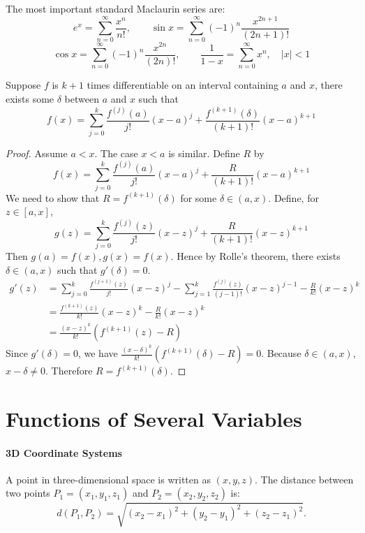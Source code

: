 \documentclass[oneside]{book}
\begin{document}
\noindent The most important standard Maclaurin series are:
\[
    e^x=\sum_{n=0}^{\infty}\frac{x^n}{n!},\qquad
    \sin x=\sum_{n=0}^{\infty}(-1)^n\frac{x^{2n+1}}{(2n+1)!}
\]
\[
    \cos x=\sum_{n=0}^{\infty}(-1)^n\frac{x^{2n}}{(2n)!},\qquad
    \frac1{1-x}=\sum_{n=0}^{\infty}x^n,\quad |x|<1
\]

\begin{theorem}
Suppose \(f\) is \(k+1\) times differentiable on an interval containing \(a\) and \(x\), there exists some
$\delta$ between $a$ and $x$ such that
\[
    f(x)
    =
    \sum_{j=0}^{k}\frac{f^{(j)}(a)}{j!}(x-a)^j
    +
    \frac{f^{(k+1)}(\delta)}{(k+1)!}(x-a)^{k+1}
\]
\end{theorem}

\begin{proof}
\noindent Assume \(a<x\). The case \(x<a\) is similar. Define \(R\) by
\[
    f(x)
    =
    \sum_{j=0}^{k}\frac{f^{(j)}(a)}{j!}(x-a)^j
    +
    \frac{R}{(k+1)!}(x-a)^{k+1}
\]
We need to show that \(R=f^{(k+1)}(\delta)\) for some \(\delta\in(a,x)\). Define, for \(z\in[a,x]\),
\[
    g(z)
    =
    \sum_{j=0}^{k}\frac{f^{(j)}(z)}{j!}(x-z)^j
    +
    \frac{R}{(k+1)!}(x-z)^{k+1}
\]
Then
$
    g(a)=f(x), g(x)=f(x).
$
Hence by Rolle's theorem, there exists \(\delta\in(a,x)\) such that
$
    g'(\delta)=0.
$
\[
\begin{aligned}
    g'(z)
    &=
    \sum_{j=0}^{k}\frac{f^{(j+1)}(z)}{j!}(x-z)^j
    -
    \sum_{j=1}^{k}\frac{f^{(j)}(z)}{(j-1)!}(x-z)^{j-1}
    -
    \frac{R}{k!}(x-z)^k \\
    &=
    \frac{f^{(k+1)}(z)}{k!}(x-z)^k
    -
    \frac{R}{k!}(x-z)^k \\
    &=
    \frac{(x-z)^k}{k!}\left(f^{(k+1)}(z)-R\right)
\end{aligned}
\]
Since \(g'(\delta)=0\), we have
$
    \frac{(x-\delta)^k}{k!}\left(f^{(k+1)}(\delta)-R\right)=0.
$
Because \(\delta\in(a,x)\), \(x-\delta\neq 0\). Therefore
$
    R=f^{(k+1)}(\delta).
$
\end{proof}

\section{Functions of Several Variables}

\paragraph{3D Coordinate Systems}

A point in three-dimensional space is written as $(x,y,z)$. The distance between two points $P_1=(x_1,y_1,z_1)$ and $P_2=(x_2,y_2,z_2)$ is:
\[
    d(P_1,P_2)=\sqrt{(x_2-x_1)^2+(y_2-y_1)^2+(z_2-z_1)^2}.
\]
\end{document}

